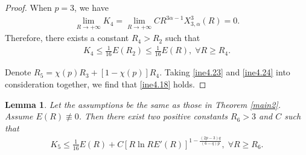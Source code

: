 \documentclass[11pt,reqno]{amsart}
\newtheorem{Lem}{Lemma}[section]
\numberwithin{Thm}{section}
\begin{document}
\begin{proof}
When $p=3$, we have
\begin{align*}
\lim\limits_{R\rightarrow+\infty}K_4=\lim\limits_{R\rightarrow+\infty}CR^{3\alpha-1}X_{3,\alpha}^3(R)=0.
\end{align*}
Therefore, there exists a constant $R_4>R_2$ such that
\begin{align}\label{ine4.24}
K_4\leq\frac{1}{16}E(R_2)\leq \frac{1}{16}E(R),\;\forall R\geq R_4.
\end{align}

Denote $R_5=\chi(p)R_3+[1-\chi(p)]R_4$. Taking \eqref{ine4.23} and \eqref{ine4.24} into consideration together, we find that \eqref{ine4.18} holds.
\end{proof}


\begin{Lem}\label{Lem4.7}
Let the assumptions be the same as those in  {\rm Theorem \ref{main2}}. Assume $E(R)\not\equiv0$. Then there exist two positive constants $R_6>3$ and $C$ such that
\begin{align}\label{ine4.25}
K_5\leq \frac{1}{16}E(R)+C \left[ R \ln R E'(R) \right]^{1-\frac{(2p-3)q}{(6-q)p}},\;\forall R\geq R_6.
\end{align}
\end{Lem}
\end{document}
